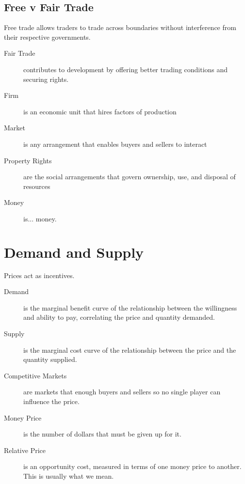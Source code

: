             \section{Free v Fair Trade} %
            \label{sec:free_v_fair_trade}
                Free trade allows traders to trade across boundaries without interference from their respective governments.

                \begin{description}
                    \item[Fair Trade] contributes to development by offering better trading conditions and securing rights.
                    \item[Firm] is an economic unit that hires factors of production
                    \item[Market] is any arrangement that enables buyers and sellers to interact
                    \item[Property Rights] are the social arrangements that govern ownership, use, and disposal of resources
                    \item[Money] is... money.
                \end{description}

        \chapter{Demand and Supply} %
        \label{cha:demand_and_supply}
            Prices act as incentives.
            \begin{description}
                \item[Demand] is the marginal benefit curve of the relationship between the willingness and ability to pay, correlating the price and quantity demanded.
                \item[Supply] is the marginal cost curve of the relationship between the price and the quantity supplied.
                \item[Competitive Markets] are markets that enough buyers and sellers so no single player can influence the price.
                \item[Money Price] is the number of dollars that must be given up for it.
                \item[Relative Price] is an opportunity cost, measured in terms of one money price to another. This is usually what we mean.
            \end{description}
